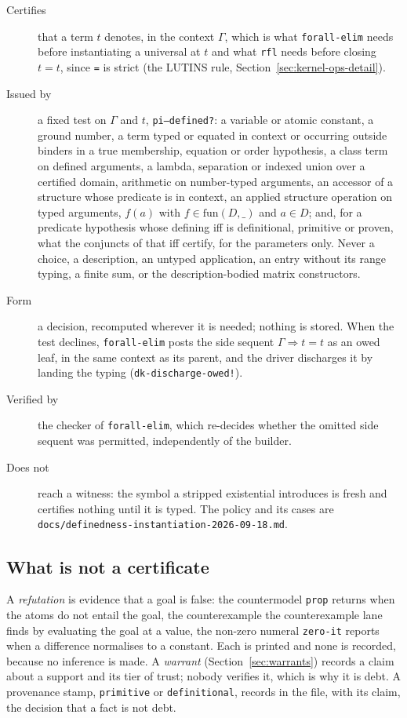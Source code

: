 \begin{description}
\item[Certifies] that a term $t$ denotes, in the context $\Gamma$, which
  is what \texttt{forall-elim} needs before instantiating a universal at
  $t$ and what \texttt{rfl} needs before closing $t = t$, since \texttt{=}
  is strict (the LUTINS rule, Section~\ref{sec:kernel-ops-detail}).
\item[Issued by] a fixed test on $\Gamma$ and $t$, \texttt{pi--defined?}:
  a variable or atomic constant, a ground number, a term typed or equated
  in context or occurring outside binders in a true membership, equation
  or order hypothesis, a class term on defined arguments, a lambda,
  separation or indexed union over a certified domain, arithmetic on
  number-typed arguments, an accessor of a structure whose predicate is in
  context, an applied structure operation on typed arguments, $f(a)$ with
  $f \in \mathrm{fun}(D, \_)$ and $a \in D$; and, for a predicate
  hypothesis whose defining iff is definitional, primitive or proven, what
  the conjuncts of that iff certify, for the parameters only.  Never a
  choice, a description, an untyped application, an entry without its
  range typing, a finite sum, or the description-bodied matrix
  constructors.
\item[Form] a decision, recomputed wherever it is needed; nothing is
  stored.  When the test declines, \texttt{forall-elim} posts the side
  sequent $\Gamma \Rightarrow t = t$ as an owed leaf, in the same context
  as its parent, and the driver discharges it by landing the typing
  (\texttt{dk-discharge-owed!}).
\item[Verified by] the checker of \texttt{forall-elim}, which re-decides
  whether the omitted side sequent was permitted, independently of the
  builder.
\item[Does not] reach a witness: the symbol a stripped existential
  introduces is fresh and certifies nothing until it is typed.  The policy
  and its cases are \texttt{docs/definedness-instantiation-2026-09-18.md}.
\end{description}

\subsection{What is not a certificate}

A \emph{refutation} is evidence that a goal is false: the countermodel
\texttt{prop} returns when the atoms do not entail the goal, the
counterexample the counterexample lane finds by evaluating the goal at a
value, the non-zero numeral \texttt{zero-it} reports when a difference
normalises to a constant.  Each is printed and none is recorded, because
no inference is made.  A \emph{warrant} (Section~\ref{sec:warrants})
records a claim about a support and its tier of trust; nobody verifies it,
which is why it is debt.  A provenance stamp, \texttt{primitive} or
\texttt{definitional}, records in the file, with its claim, the decision
that a fact is not debt.
